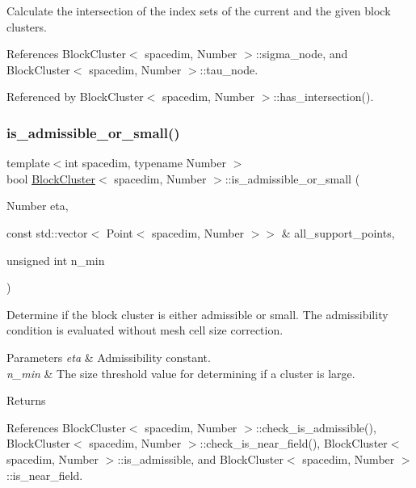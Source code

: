 Calculate the intersection of the index sets of the current and the given block clusters. 

References Block\+Cluster$<$ spacedim, Number $>$\+::sigma\+\_\+node, and Block\+Cluster$<$ spacedim, Number $>$\+::tau\+\_\+node.



Referenced by Block\+Cluster$<$ spacedim, Number $>$\+::has\+\_\+intersection().

\mbox{\label{classBlockCluster_a3d1d12357cac0ff4df90fd576c5f2aa0}} 
\subsubsection{\texorpdfstring{is\+\_\+admissible\+\_\+or\+\_\+small()}{is\_admissible\_or\_small()}\hspace{0.1cm}{\footnotesize\ttfamily [1/2]}}
{\footnotesize\ttfamily template$<$int spacedim, typename Number $>$ \\
bool \hyperlink{classBlockCluster}{Block\+Cluster}$<$ spacedim, Number $>$\+::is\+\_\+admissible\+\_\+or\+\_\+small (\begin{DoxyParamCaption}\item[{Number}]{eta,  }\item[{const std\+::vector$<$ Point$<$ spacedim, Number $>$$>$ \&}]{all\+\_\+support\+\_\+points,  }\item[{unsigned int}]{n\+\_\+min }\end{DoxyParamCaption})}

Determine if the block cluster is either admissible or small. The admissibility condition is evaluated without mesh cell size correction.


\begin{DoxyParams}{Parameters}
{\em eta} & Admissibility constant. \\
\hline
{\em n\+\_\+min} & The size threshold value for determining if a cluster is large. \\
\hline
\end{DoxyParams}
\begin{DoxyReturn}{Returns}

\end{DoxyReturn}


References Block\+Cluster$<$ spacedim, Number $>$\+::check\+\_\+is\+\_\+admissible(), Block\+Cluster$<$ spacedim, Number $>$\+::check\+\_\+is\+\_\+near\+\_\+field(), Block\+Cluster$<$ spacedim, Number $>$\+::is\+\_\+admissible, and Block\+Cluster$<$ spacedim, Number $>$\+::is\+\_\+near\+\_\+field.

